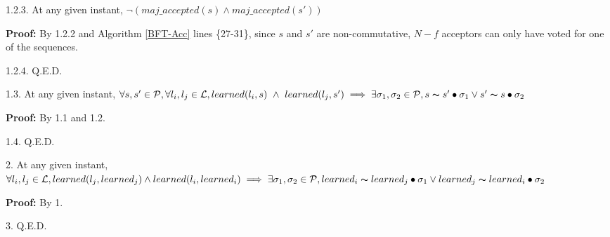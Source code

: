 \indent\indent\indent\indent\indent\parbox{\linewidth}{\strut1.2.3. At any given instant, $\neg (maj\_accepted(s) \land maj\_accepted(s'))$ } \par
\indent\indent\indent\indent\indent\indent\parbox{\linewidth-\algorithmicindent*6}{\strut\textbf{Proof:} By 1.2.2 and Algorithm \ref{BFT-Acc} lines \{27-31\}, since $s$ and $s'$ are non-commutative, $N-f$ acceptors can only have voted for one of the sequences.}\par
\indent\indent\indent\indent\indent\parbox{\linewidth}{\strut1.2.4. Q.E.D. }\par
\indent\indent\indent\parbox{\linewidth-\algorithmicindent*3}{\strut1.3. At any given instant, $\forall s,s' \in \mathcal{P}, \forall l_i,l_j \in \mathcal{L}, learned(l_i,s)\ \land\ learned(l_j,s') \implies \exists \sigma_1,\sigma_2 \in \mathcal{P}, s \thicksim s' \bullet \sigma_1 \lor s' \thicksim s \bullet \sigma_2$ }\par
\indent\indent\indent\indent\parbox{\linewidth}{\strut\textbf{Proof:} By 1.1 and 1.2.}\par
\indent\indent\indent\parbox{\linewidth}{\strut1.4. Q.E.D. }\par
\parbox{\linewidth-\algorithmicindent*3}{\strut2. At any given instant, $\forall l_i,l_j \in \mathcal{L}, learned(l_j,learned_j) \land learned(l_i,learned_i) \implies \exists \sigma_1,\sigma_2 \in \mathcal{P}, learned_i \thicksim learned_j \bullet \sigma_1 \lor learned_j \thicksim learned_i \bullet \sigma_2$}\par
\indent\indent\parbox{\linewidth}{\strut\textbf{Proof:} By 1.}\par
\parbox{\linewidth}{\strut3. Q.E.D.} \par


